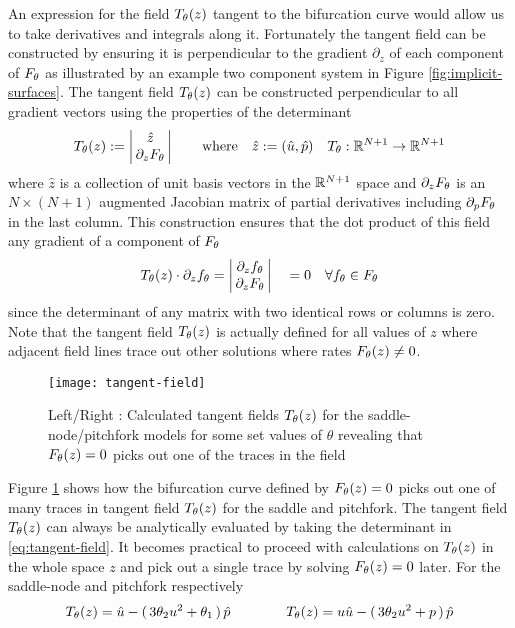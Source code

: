 An expression for the field $T_{\theta}(z)$ tangent to the bifurcation curve would allow us to take derivatives and integrals along it. Fortunately the tangent field can be constructed by ensuring it is perpendicular to the gradient $\partial_z$ of each component of $F_{\theta}$ as illustrated by an example two component system in Figure \ref{fig:implicit-surfaces}. The tangent field $T_{\theta}(z)$ can be constructed perpendicular to all gradient vectors using the properties of the determinant \cite{Goldman2005CurvatureSurfaces}
\begin{align}
    T_{\theta}(z):=
    \left|\begin{matrix}
        \hat{z} \\
        \,\partial_{z}F_{\theta}\,
    \end{matrix}\right|
    \qquad\mathrm{where}\quad
    \hat{z}:=(\hat{u},\hat{p})\quad
	T_{\theta} : \mathbb{R}^{N+1}\rightarrow\mathbb{R}^{N+1}
	\label{eq:tangent-field}
\end{align}
where $\hat{z}$ is a collection of unit basis vectors in the $\mathbb{R}^{N+1}$ space and $\partial_{z}F_{\theta}$ is an $N\times(N+1)$ augmented Jacobian matrix of partial derivatives including $\partial_p F_{\theta}$ in the last column. This construction ensures that the dot product of this field any gradient of a component of $F_{\theta}$
\begin{align}
    T_{\theta}(z)\cdot\partial_z f_{\theta} =
    \left|\begin{matrix}
        \partial_z f_{\theta} \\
        \,\partial_{z}F_{\theta}\,
    \end{matrix}\right|
    \quad =0 \quad\forall f_{\theta}\in F_{\theta}
\end{align}
since the determinant of any matrix with two identical rows or columns is zero. Note that the tangent field $T_{\theta}(z)$ is actually defined for all values of $z$ where adjacent field lines trace out other solutions where rates $F_{\theta}(z)\neq0$.

\begin{figure}[H]
\centering{}
\captionsetup{justification=centering}
\texttt{[image: tangent-field]}
\caption{Left/Right : Calculated tangent fields $T_{\theta}(z)$ for the saddle-node/pitchfork models for some set values of $\theta$ revealing that $F_{\theta}(z)=0$ picks out one of the traces in the field}
\label{fig:tangent-field}
\end{figure}

Figure \ref{fig:tangent-field} shows how the bifurcation curve defined by $F_{\theta}(z)=0$ picks out one of many traces in tangent field $T_{\theta}(z)$ for the saddle and pitchfork. The tangent field $T_{\theta}(z)$ can always be analytically evaluated by taking the determinant in \eqref{eq:tangent-field}. It becomes practical to proceed with calculations on $T_{\theta}(z)$ in the whole space $z$ and pick out a single trace by solving $F_{\theta}(z)=0$ later. For the saddle-node and pitchfork respectively
\begin{align}
    T_{\theta}(z)=\hat{u}-(\,3\theta_2 u^2+\theta_1\,)\,\hat{p}
    \qquad\qquad
    T_{\theta}(z)=u\hat{u}-(\,3\theta_2 u^2+p\,)\,\hat{p}
    \label{eq:tangent-field-examples}
\end{align}

